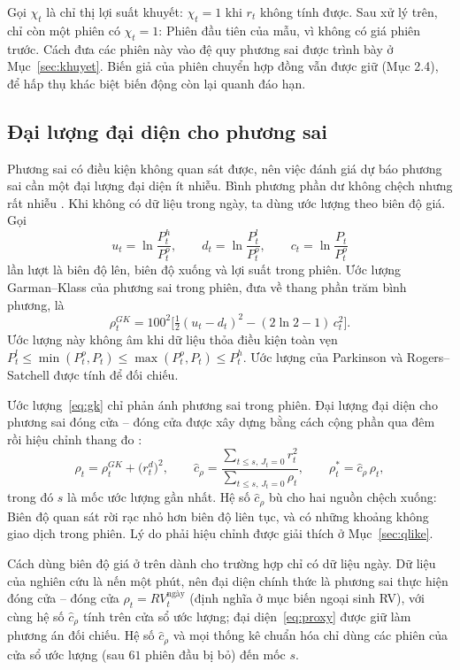 \documentclass[12pt,a4paper]{article}
\theoremstyle{definition}
\theoremstyle{remark}
\begin{document}
Gọi $\chi_t$ là chỉ thị lợi suất khuyết: $\chi_t=1$ khi $r_t$ không tính được. Sau xử lý trên, chỉ còn một phiên có $\chi_t=1$: Phiên đầu tiên của mẫu, vì không có giá phiên trước. Cách đưa các phiên này vào đệ quy phương sai được trình bày ở Mục~\ref{sec:khuyet}. Biến giả của phiên chuyển hợp đồng vẫn được giữ (Mục 2.4), để hấp thụ khác biệt biến động còn lại quanh đáo hạn.

\subsection{Đại lượng đại diện cho phương sai}\label{sec:proxy}

Phương sai có điều kiện không quan sát được, nên việc đánh giá dự báo phương sai cần một đại lượng đại diện ít nhiễu. Bình phương phần dư không chệch nhưng rất nhiễu \cite{patton2011}. Khi không có dữ liệu trong ngày, ta dùng ước lượng theo biên độ giá. Gọi
\begin{equation}
u_t=\ln\frac{P^{h}_t}{P^{o}_t},\qquad d_t=\ln\frac{P^{l}_t}{P^{o}_t},\qquad c_t=\ln\frac{P_t}{P^{o}_t}
\end{equation}
lần lượt là biên độ lên, biên độ xuống và lợi suất trong phiên. Ước lượng Garman--Klass \cite{garmanklass1980} của phương sai trong phiên, đưa về thang phần trăm bình phương, là
\begin{equation}\label{eq:gk}
\rho^{GK}_t=100^2\Big[\tfrac12(u_t-d_t)^2-(2\ln2-1)\,c_t^2\Big].
\end{equation}
Ước lượng này không âm khi dữ liệu thỏa điều kiện toàn vẹn $P^{l}_t\le\min(P^{o}_t,P_t)\le\max(P^{o}_t,P_t)\le P^{h}_t$. Ước lượng của Parkinson \cite{parkinson1980} và Rogers--Satchell \cite{rogers1991} được tính để đối chiếu.

Ước lượng~\eqref{eq:gk} chỉ phản ánh phương sai trong phiên. Đại lượng đại diện cho phương sai đóng cửa -- đóng cửa được xây dựng bằng cách cộng phần qua đêm rồi hiệu chỉnh thang đo \cite{hansenlunde2005rv}:
\begin{equation}\label{eq:proxy}
\rho_t=\rho^{GK}_t+\big(r^{d}_t\big)^2,\qquad
\hat c_\rho=\frac{\sum_{t\le s,\,J_t=0}r_t^2}{\sum_{t\le s,\,J_t=0}\rho_t},\qquad
\rho^{*}_t=\hat c_\rho\,\rho_t ,
\end{equation}
trong đó $s$ là mốc ước lượng gần nhất. Hệ số $\hat c_\rho$ bù cho hai nguồn chệch xuống: Biên độ quan sát rời rạc nhỏ hơn biên độ liên tục, và có những khoảng không giao dịch trong phiên. Lý do phải hiệu chỉnh được giải thích ở Mục~\ref{sec:qlike}.

Cách dùng biên độ giá ở trên dành cho trường hợp chỉ có dữ liệu ngày. Dữ liệu của nghiên cứu là nến một phút, nên đại diện chính thức là phương sai thực hiện đóng cửa -- đóng cửa $\rho_t=RV^{\text{ngày}}_t$ (định nghĩa ở mục biến ngoại sinh RV), với cùng hệ số $\hat c_\rho$ tính trên cửa sổ ước lượng; đại diện~\eqref{eq:proxy} được giữ làm phương án đối chiếu. Hệ số $\hat c_\rho$ và mọi thống kê chuẩn hóa chỉ dùng các phiên của cửa sổ ước lượng (sau $61$ phiên đầu bị bỏ) đến mốc $s$.
\end{document}
